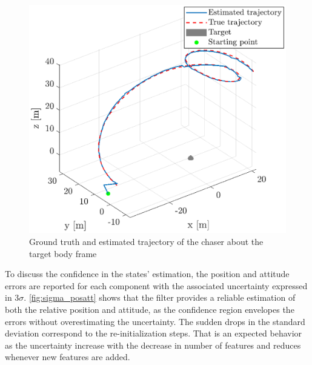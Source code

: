 \begin{figure}[!h]
    \centering
    \includegraphics[width = 0.8\linewidth]{Images/esttraj.eps}
    \caption[Ground truth and estimated trajectory]{Ground truth and estimated trajectory of the chaser about the target body frame}
    \label{fig:estrajectory}
\end{figure}
To discuss the confidence in the states' estimation, the position and attitude errors are reported for each component with the associated uncertainty expressed in $3\sigma$. \cref{fig:sigma_posatt} shows that the filter provides a reliable estimation of both the relative position and attitude, as the confidence region envelopes the errors without overestimating the uncertainty. The sudden drops in the standard deviation correspond to the re-initialization steps. That is an expected behavior as the uncertainty increase with the decrease in number of features and reduces whenever new features are added.\newline
